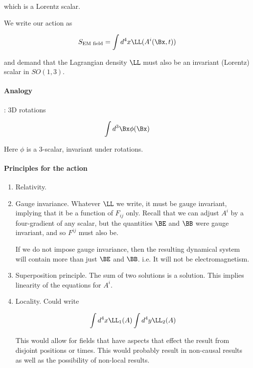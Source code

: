 which is a Lorentz scalar.

We write our action as 

\begin{equation}\label{eqn:relativisticElectrodynamicsL12:170}
S_{\text{EM field}} = \int d^4 x \LL(A^i(\Bx, t))
\end{equation}

and demand that the Lagrangian density $\LL$ must also be an invariant (Lorentz) scalar in $SO(1,3)$.

\paragraph{Analogy}: 3D rotations

\begin{equation}\label{eqn:relativisticElectrodynamicsL12:190}
\int d^3 \Bx \phi(\Bx)
\end{equation}

Here $\phi$ is a 3-scalar, invariant under rotations.

\paragraph{Principles for the action}

\begin{enumerate}
\item Relativity.
\item Gauge invariance.  Whatever $\LL$ we write, it must be gauge invariant, implying that it be a function of $F_{ij}$ only.  Recall that we can adjust $A^i$ by a four-gradient of any scalar, but the quantities $\BE$ and $\BB$ were gauge invariant, and so $F^{ij}$ must also be.

If we do not impose gauge invariance, then the resulting dynamical system will contain more than just $\BE$ and $\BB$.  i.e. It will not be electromagnetism.

\item Superposition principle.  The sum of two solutions is a solution.  This implies linearity of the equations for $A^i$.

\item Locality.  Could write

\begin{equation}\label{eqn:relativisticElectrodynamicsL12:210}
\int d^4 x \LL_1(A) \int d^4 y \LL_2(A)
\end{equation}

This would allow for fields that have aspects that effect the result from disjoint positions or times.  This would probably result in non-causal results as well as the possibility of non-local results.
\end{enumerate}

